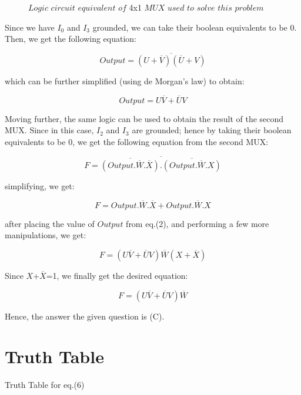 \documentclass{article}
\begin{document}
\begin{figure}[H]
\centering

\caption{$Logic$ $circuit$ $equivalent$ $of$ 4x1 $MUX$ $used$ $to$ $solve$ $this$ $problem$}
\label{mux1}
\end{figure}

Since we have $I_0$ and $I_3$ grounded, we can take their boolean equivalents to be 0. Then, we get the following equation:

\begin{equation}
    Output = \overline{ (U + \overline{V}) (\overline{U} + V) }
\end{equation}

which can be further simplified (using de Morgan's law) to obtain:

\begin{equation}
    Output = U \overline{V} + \overline{U} V
\end{equation}

Moving further, the same logic can be used to obtain the result of the second MUX. Since in this case, $I_2$ and $I_3$ are grounded; hence by taking their boolean equivalents to be 0, we get the following equation from the second MUX:

\begin{equation}
    F = \overline{ \overline{(Output. \overline{W}. \overline{X})}. \overline{(Output. \overline{W}. X )}}
\end{equation}

simplifying, we get:

\begin{equation}
    F = Output.\overline{W}.\overline{X} + Output.\overline{W}.X
\end{equation}

after placing the value of $Output$ from eq.(2), and performing a few more manipulations, we get:

\begin{equation}
    F = (U\overline{V}+\overline{U}V)\overline{W}(X+\overline{X})
\end{equation}

Since $X$+$\overline{X}$=1, we finally get the desired equation:

\begin{equation}
    F = (U\overline{V}+\overline{U}V)\overline{W}
\end{equation}

Hence, the answer the given question is (C).

\section{Truth Table}
\begin{table}[!h]
\centering
\scalebox{1.6}{

}
\caption{Truth Table for eq.(6)}
\label{table1}
\end{table}
\end{document}
